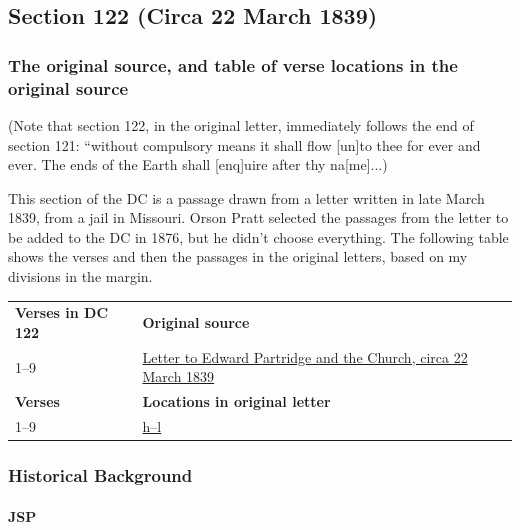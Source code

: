 \subsection{Section 122 (Circa 22 March 1839)}
	\label{DC122}
	
	\subsubsection{The original source, and table of verse locations in the original source}
	
		(Note that section 122, in the original letter, immediately follows the end of section 121: ``without compulsory means it shall flow [un]to thee for ever and ever. The ends of the Earth shall [enq]uire after thy na[me]...)
	
		This section of the DC is a passage drawn from a letter written in late March 1839, from a jail in Missouri. Orson Pratt selected the passages from the letter to be added to the DC in 1876, but he didn't choose everything. The following table shows the verses and then the passages in the original letters, based on my divisions in the margin.
		
		\begin{table}[H]
			\begin{tabular}{p{4cm}p{10cm}}
				\textbf{Verses in DC 122} & \textbf{Original source} \\
				1--9 & \hyperref[EMS-1839-JS-CIR-22-MAR-1839]{Letter to Edward Partridge and the Church, circa 22 March 1839} \\
				\textbf{Verses} & \textbf{Locations in original letter} \\
				1--9 & \hyperlink{EMS-1839-JS-CIR-22-MAR-1839-h}{h--l} \\
			\end{tabular}
		\end{table}
		
	\subsubsection{Historical Background}
		\label{DC122-HB}
		
		\paragraph{JSP}
		
